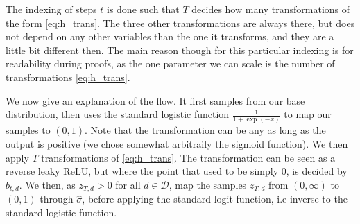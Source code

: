 The indexing of steps \(t\) is done such
that \(T\) decides how many transformations of the form \cref{eq:h_trans}. The three other transformations are always there,
but does not depend on any other variables than the one it transforms, and they are a little bit different then. The main reason though for this
particular indexing is for readability during proofs, as the one parameter we can scale is the number of transformations \cref{eq:h_trans}. 

We now give an explanation of the flow. It first samples from our base distribution, then uses the standard logistic function 
\(\frac{1}{1+\exp(-x)}\) to map our samples to \((0,1)\). Note that the transformation can be any as long as
the output is positive (we chose somewhat arbitraily the sigmoid function). 
We then apply \(T\) transformations of \cref{eq:h_trans}. The transformation can be seen as a reverse
leaky ReLU, but where the point that used to be simply \(0\), is decided by \(b_{t,d}\). 
We then, as \(z_{T,d} > 0\) for all 
\(d \in \mathcal{D}\), map the samples \(z_{T,d}\) from \((0,\infty)\) to \((0,1)\) through \(\hat{\sigma}\), before applying 
the standard logit function, i.e inverse to the standard logistic function. 

